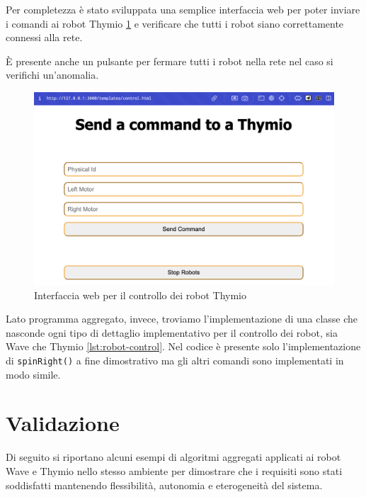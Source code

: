 \documentclass[12pt,a4paper,openright,twoside]{book}
\begin{document}




Per completezza è stato sviluppata una semplice interfaccia web per poter inviare i comandi ai robot Thymio \cref{fig:web-interface} e verificare che tutti i robot siano correttamente connessi alla rete.

È presente anche un pulsante per fermare tutti i robot nella rete nel caso si verifichi un'anomalia.

\begin{figure}
    \centering
    \includegraphics[width=.8\linewidth]{figures/web-interface.png}
    \caption{Interfaccia web per il controllo dei robot Thymio}
    \label{fig:web-interface}
\end{figure}

Lato programma aggregato, invece, troviamo l'implementazione di una classe che nasconde ogni tipo di dettaglio implementativo per il controllo dei robot, sia Wave che Thymio \cref{lst:robot-control}. Nel codice è presente solo l'implementazione di \verb|spinRight()| a fine dimostrativo ma gli altri comandi sono implementati in modo simile.



\section{Validazione}

Di seguito si riportano alcuni esempi di algoritmi aggregati applicati ai robot Wave e Thymio nello stesso ambiente per dimostrare che i requisiti sono stati soddisfatti mantenendo flessibilità, autonomia e eterogeneità del sistema.
\end{document}
